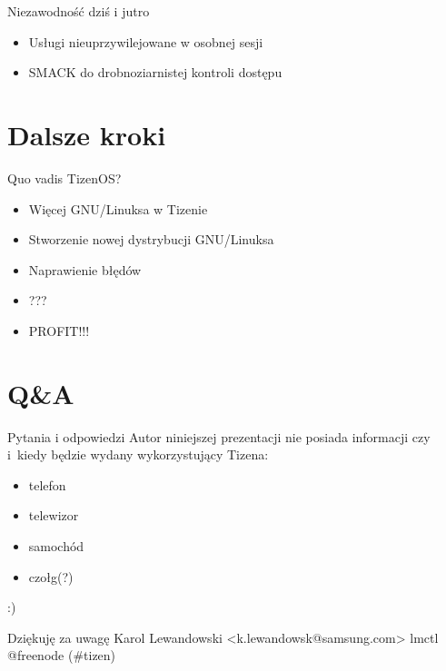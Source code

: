 \documentclass[presentation,aspectratio=43,12pt]{beamer}
\begin{document}
\begin{frame}[label=sec-5-3]{Niezawodność dziś i jutro}
\begin{itemize}
\item Usługi nieuprzywilejowane w osobnej sesji

\item SMACK do drobnoziarnistej kontroli dostępu
\end{itemize}
\end{frame}
\section{Dalsze kroki}
\label{sec-6}

\begin{frame}[label=sec-6-1]{Quo vadis TizenOS?}
\begin{itemize}
\item Więcej GNU/Linuksa w Tizenie
\end{itemize}

\pause

\begin{itemize}
\item Stworzenie nowej dystrybucji GNU/Linuksa
\item Naprawienie błędów
\item ???
\item PROFIT!!!
\end{itemize}
\end{frame}
\section{Q\&A}
\label{sec-7}

\begin{frame}[label=sec-7-1]{Pytania i odpowiedzi}
Autor niniejszej prezentacji nie posiada informacji czy i~kiedy będzie
wydany wykorzystujący Tizena:

\begin{itemize}
\item telefon
\item telewizor
\item samochód
\item czołg(?)
\end{itemize}

:)
\end{frame}

\begin{frame}[label=sec-7-2]{Dziękuję za uwagę}
Karol Lewandowski <k.lewandowsk@samsung.com>
lmctl @freenode (\#tizen)
\end{frame}
\end{document}
